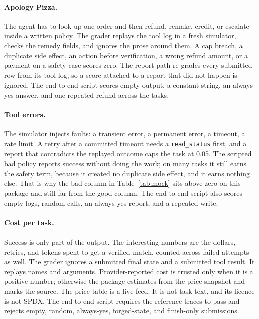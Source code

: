 \paragraph{Apology Pizza.}
The agent has to look up one order and then refund, remake, credit, or escalate inside a written policy. The grader replays the tool log in a fresh simulator, checks the remedy fields, and ignores the prose around them. A cap breach, a duplicate side effect, an action before verification, a wrong refund amount, or a payment on a safety case scores zero. The report path re-grades every submitted row from its tool log, so a score attached to a report that did not happen is ignored. The end-to-end script scores empty output, a constant string, an always-yes answer, and one repeated refund across the tasks.

\paragraph{Tool errors.}
The simulator injects faults: a transient error, a permanent error, a timeout, a rate limit. A retry after a committed timeout needs a \texttt{read\_status} first, and a report that contradicts the replayed outcome caps the task at 0.05. The scripted bad policy reports success without doing the work; on many tasks it still earns the safety term, because it created no duplicate side effect, and it earns nothing else. That is why the bad column in Table~\ref{tab:mock} sits above zero on this package and still far from the good column. The end-to-end script also scores empty logs, random calls, an always-yes report, and a repeated write.

\paragraph{Cost per task.}
Success is only part of the output. The interesting numbers are the dollars, retries, and tokens spent to get a verified match, counted across failed attempts as well. The grader ignores a submitted final state and a submitted tool result. It replays names and arguments. Provider-reported cost is trusted only when it is a positive number; otherwise the package estimates from the price snapshot and marks the source. The price table is a live feed. It is not task text, and its licence is not SPDX. The end-to-end script requires the reference traces to pass and rejects empty, random, always-yes, forged-state, and finish-only submissions.


